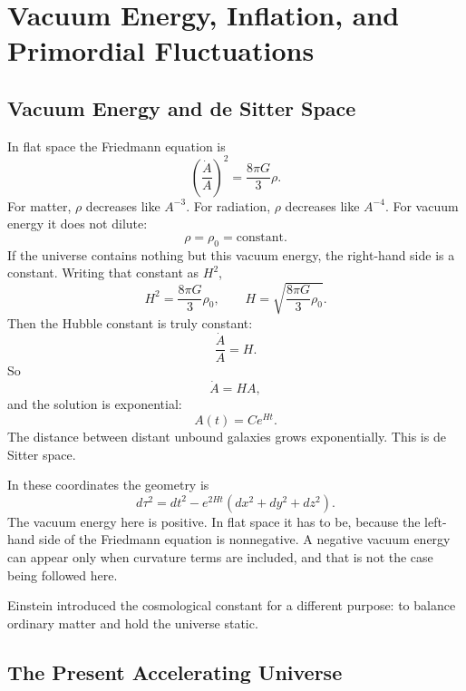 \chapter{Vacuum Energy, Inflation, and Primordial Fluctuations}

\section{Vacuum Energy and de Sitter Space}

In flat space the Friedmann equation is
\begin{equation}
\left(\frac{\dot A}{A}\right)^2=\frac{8\pi G}{3}\rho.
\end{equation}
For matter, \(\rho\) decreases like \(A^{-3}\). For radiation, \(\rho\) decreases like \(A^{-4}\). For vacuum energy it does not dilute:
\begin{equation}
\rho=\rho_0=\text{constant}.
\end{equation}
If the universe contains nothing but this vacuum energy, the right-hand side is a constant. Writing that constant as \(H^2\),
\begin{equation}
H^2=\frac{8\pi G}{3}\rho_0,
\qquad
H=\sqrt{\frac{8\pi G}{3}\rho_0}.
\end{equation}
Then the Hubble constant is truly constant:
\begin{equation}
\frac{\dot A}{A}=H.
\end{equation}
So
\begin{equation}
\dot A=HA,
\end{equation}
and the solution is exponential:
\begin{equation}
A(t)=C e^{Ht}.
\end{equation}
The distance between distant unbound galaxies grows exponentially. This is de Sitter space.

In these coordinates the geometry is
\begin{equation}
d\tau^2=dt^2-e^{2Ht}\left(dx^2+dy^2+dz^2\right).
\end{equation}
The vacuum energy here is positive. In flat space it has to be, because the left-hand side of the Friedmann equation is nonnegative. A negative vacuum energy can appear only when curvature terms are included, and that is not the case being followed here.

Einstein introduced the cosmological constant for a different purpose: to balance ordinary matter and hold the universe static.

\section{The Present Accelerating Universe}

